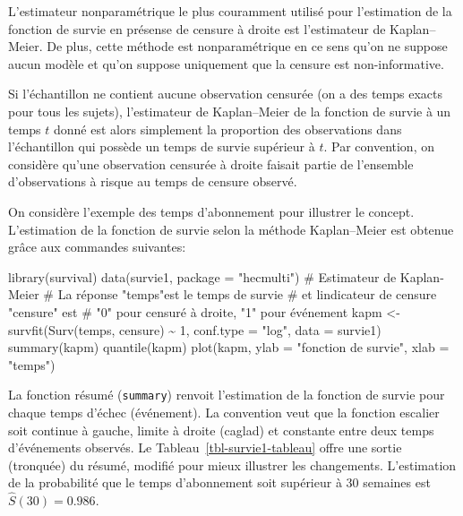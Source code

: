 \documentclass[
  11pt,
  letterpaper,
]{scrbook}
\newenvironment{Shaded}{\begin{snugshade}}{\end{snugshade}}
\newcommand{\AttributeTok}[1]{\textcolor[rgb]{0.40,0.45,0.13}{#1}}
\newcommand{\CommentTok}[1]{\textcolor[rgb]{0.37,0.37,0.37}{#1}}
\newcommand{\DecValTok}[1]{\textcolor[rgb]{0.68,0.00,0.00}{#1}}
\newcommand{\FunctionTok}[1]{\textcolor[rgb]{0.28,0.35,0.67}{#1}}
\newcommand{\NormalTok}[1]{\textcolor[rgb]{0.00,0.23,0.31}{#1}}
\newcommand{\OtherTok}[1]{\textcolor[rgb]{0.00,0.23,0.31}{#1}}
\newcommand{\SpecialCharTok}[1]{\textcolor[rgb]{0.37,0.37,0.37}{#1}}
\newcommand{\StringTok}[1]{\textcolor[rgb]{0.13,0.47,0.30}{#1}}
\theoremstyle{definition}
\theoremstyle{remark}
\begin{document}
L'estimateur nonparamétrique le plus couramment utilisé pour
l'estimation de la fonction de survie en présense de censure à droite
est l'estimateur de Kaplan--Meier. De plus, cette méthode est
nonparamétrique en ce sens qu'on ne suppose aucun modèle et qu'on
suppose uniquement que la censure est non-informative.

Si l'échantillon ne contient aucune observation censurée (on a des temps
exacts pour tous les sujets), l'estimateur de Kaplan--Meier de la
fonction de survie à un temps \(t\) donné est alors simplement la
proportion des observations dans l'échantillon qui possède un temps de
survie supérieur à \(t\). Par convention, on considère qu'une
observation censurée à droite faisait partie de l'ensemble
d'observations à risque au temps de censure observé.

On considère l'exemple des temps d'abonnement pour illustrer le concept.
L'estimation de la fonction de survie selon la méthode Kaplan--Meier est
obtenue grâce aux commandes suivantes:

\begin{Shaded}
\begin{Highlighting}[]
\FunctionTok{library}\NormalTok{(survival)}
\FunctionTok{data}\NormalTok{(survie1, }\AttributeTok{package =} \StringTok{"hecmulti"}\NormalTok{)}
\CommentTok{\# Estimateur de Kaplan{-}Meier}
\CommentTok{\# La réponse "temps"est le temps de survie }
\CommentTok{\# et l\textquotesingle{}indicateur de censure "censure" est}
\CommentTok{\# "0" pour censuré à droite, "1" pour événement}
\NormalTok{kapm }\OtherTok{\textless{}{-}} 
  \FunctionTok{survfit}\NormalTok{(}\FunctionTok{Surv}\NormalTok{(temps, censure) }\SpecialCharTok{\textasciitilde{}} \DecValTok{1}\NormalTok{, }
          \AttributeTok{conf.type =} \StringTok{"log"}\NormalTok{, }
          \AttributeTok{data =}\NormalTok{ survie1)}
\FunctionTok{summary}\NormalTok{(kapm)}
\FunctionTok{quantile}\NormalTok{(kapm)}
\FunctionTok{plot}\NormalTok{(kapm, }
     \AttributeTok{ylab =} \StringTok{"fonction de survie"}\NormalTok{, }
     \AttributeTok{xlab =} \StringTok{"temps"}\NormalTok{) }
\end{Highlighting}
\end{Shaded}

La fonction résumé (\texttt{summary}) renvoit l'estimation de la
fonction de survie pour chaque temps d'échec (événement). La convention
veut que la fonction escalier soit continue à gauche, limite à droite
(caglad) et constante entre deux temps d'événements observés. Le
Tableau~\ref{tbl-survie1-tableau} offre une sortie (tronquée) du résumé,
modifié pour mieux illustrer les changements. L'estimation de la
probabilité que le temps d'abonnement soit supérieur à 30 semaines est
\(\widehat{S}(30)=0.986\).
\end{document}
